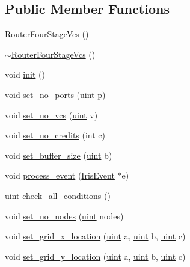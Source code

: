 \subsection*{Public Member Functions}
\begin{CompactItemize}
\item 
\hyperlink{classRouterFourStageVcs_4ab2afa09beddb03b1c2e1a9658c4ffd}{RouterFourStageVcs} ()
\item 
\hyperlink{classRouterFourStageVcs_d81c40fe3a0d48cf9e6475b3ad9b3f33}{$\sim$RouterFourStageVcs} ()
\item 
void \hyperlink{classRouterFourStageVcs_203c41c81023398f78d90731b6fa3299}{init} ()
\item 
void \hyperlink{classRouterFourStageVcs_a8b764ec1d80fabdd6c9573f6e860149}{set\_\-no\_\-ports} (\hyperlink{outputBuffer_8h_91ad9478d81a7aaf2593e8d9c3d06a14}{uint} p)
\item 
void \hyperlink{classRouterFourStageVcs_e68dab8bc043b0922c5a02fa64ccbf14}{set\_\-no\_\-vcs} (\hyperlink{outputBuffer_8h_91ad9478d81a7aaf2593e8d9c3d06a14}{uint} v)
\item 
void \hyperlink{classRouterFourStageVcs_87998d0b2fb2c60ffdc21e20000696b0}{set\_\-no\_\-credits} (int c)
\item 
void \hyperlink{classRouterFourStageVcs_94759bddc4770f0ce40545682606847a}{set\_\-buffer\_\-size} (\hyperlink{outputBuffer_8h_91ad9478d81a7aaf2593e8d9c3d06a14}{uint} b)
\item 
void \hyperlink{classRouterFourStageVcs_81562fa747c216e200476ab1f85699bf}{process\_\-event} (\hyperlink{classIrisEvent}{IrisEvent} $\ast$e)
\item 
\hyperlink{outputBuffer_8h_91ad9478d81a7aaf2593e8d9c3d06a14}{uint} \hyperlink{classRouterFourStageVcs_74ebbb630955fad918eef15c2bc39bcf}{check\_\-all\_\-conditions} ()
\item 
void \hyperlink{classRouterFourStageVcs_991fb1adc65124da8dc100855835a193}{set\_\-no\_\-nodes} (\hyperlink{outputBuffer_8h_91ad9478d81a7aaf2593e8d9c3d06a14}{uint} nodes)
\item 
void \hyperlink{classRouterFourStageVcs_c11828571c463389fd410cd4e80768fb}{set\_\-grid\_\-x\_\-location} (\hyperlink{outputBuffer_8h_91ad9478d81a7aaf2593e8d9c3d06a14}{uint} a, \hyperlink{outputBuffer_8h_91ad9478d81a7aaf2593e8d9c3d06a14}{uint} b, \hyperlink{outputBuffer_8h_91ad9478d81a7aaf2593e8d9c3d06a14}{uint} c)
\item 
void \hyperlink{classRouterFourStageVcs_dc137468a451d509ee2e24b2b1380930}{set\_\-grid\_\-y\_\-location} (\hyperlink{outputBuffer_8h_91ad9478d81a7aaf2593e8d9c3d06a14}{uint} a, \hyperlink{outputBuffer_8h_91ad9478d81a7aaf2593e8d9c3d06a14}{uint} b, \hyperlink{outputBuffer_8h_91ad9478d81a7aaf2593e8d9c3d06a14}{uint} c)

\end{CompactItemize}
